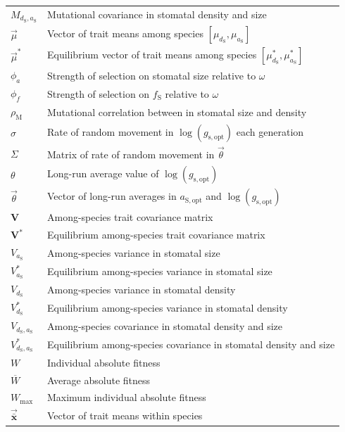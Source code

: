 \documentclass[
  letterpaper,
  DIV=11,
  numbers=noendperiod]{scrartcl}
\begin{document}
\begin{longtable}[]{@{}
  >{\raggedright\arraybackslash}p{}
  >{\raggedright\arraybackslash}p{}@{}}
\(M_{d_\mathrm{S},a_\mathrm{S}}\) & Mutational covariance in stomatal
density and size \\
\(\vec{\mu}\) & Vector of trait means among species
\([\mu_{d_\mathrm{S}}, \mu_{a_\mathrm{S}}]\) \\
\(\vec{\mu}^*\) & Equilibrium vector of trait means among species
\([\mu_{d_\mathrm{S}}^*, \mu_{a_\mathrm{S}}^*]\) \\
\(\phi_a\) & Strength of selection on stomatal size relative to
\(\omega\) \\
\(\phi_f\) & Strength of selection on \(f_\mathrm{S}\) relative to
\(\omega\) \\
\(\rho_\mathrm{M}\) & Mutational correlation between in stomatal size
and density \\
\(\sigma\) & Rate of random movement in
\(\log \left( g_\mathrm{s,opt} \right)\) each generation \\
\(\Sigma\) & Matrix of rate of random movement in \(\vec{\theta}\) \\
\(\theta\) & Long-run average value of
\(\log \left( g_\mathrm{s,opt} \right)\) \\
\(\vec{\theta}\) & Vector of long-run averages in \(a_\mathrm{S,opt}\)
and \(\log \left( g_\mathrm{s,opt} \right)\) \\
\(\mathbf{V}\) & Among-species trait covariance matrix \\
\(\mathbf{V}^*\) & Equilibrium among-species trait covariance matrix \\
\(V_{a_\mathrm{S}}\) & Among-species variance in stomatal size \\
\(V_{a_\mathrm{S}}^*\) & Equilibrium among-species variance in stomatal
size \\
\(V_{d_\mathrm{S}}\) & Among-species variance in stomatal density \\
\(V_{d_\mathrm{S}}^*\) & Equilibrium among-species variance in stomatal
density \\
\(V_{d_\mathrm{S},a_\mathrm{S}}\) & Among-species covariance in stomatal
density and size \\
\(V_{d_\mathrm{S},a_\mathrm{S}}^*\) & Equilibrium among-species
covariance in stomatal density and size \\
\(W\) & Individual absolute fitness \\
\(\overline{W}\) & Average absolute fitness \\
\(W_\mathrm{max}\) & Maximum individual absolute fitness \\
\(\vec{\bar{\mathbf{x}}}\) & Vector of trait means within species

\end{longtable}
\end{document}
